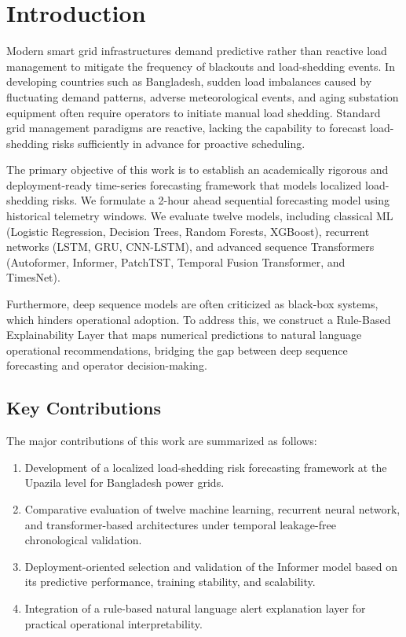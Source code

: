 \section{Introduction}
Modern smart grid infrastructures demand predictive rather than reactive load management to mitigate the frequency of blackouts and load-shedding events. In developing countries such as Bangladesh, sudden load imbalances caused by fluctuating demand patterns, adverse meteorological events, and aging substation equipment often require operators to initiate manual load shedding. Standard grid management paradigms are reactive, lacking the capability to forecast load-shedding risks sufficiently in advance for proactive scheduling.

The primary objective of this work is to establish an academically rigorous and deployment-ready time-series forecasting framework that models localized load-shedding risks. We formulate a 2-hour ahead sequential forecasting model using historical telemetry windows. We evaluate twelve models, including classical ML (Logistic Regression, Decision Trees, Random Forests, XGBoost), recurrent networks (LSTM, GRU, CNN-LSTM), and advanced sequence Transformers (Autoformer, Informer, PatchTST, Temporal Fusion Transformer, and TimesNet).

Furthermore, deep sequence models are often criticized as black-box systems, which hinders operational adoption. To address this, we construct a Rule-Based Explainability Layer that maps numerical predictions to natural language operational recommendations, bridging the gap between deep sequence forecasting and operator decision-making.

\subsection{Key Contributions}
The major contributions of this work are summarized as follows:
\begin{enumerate}
    \item Development of a localized load-shedding risk forecasting framework at the Upazila level for Bangladesh power grids.
    \item Comparative evaluation of twelve machine learning, recurrent neural network, and transformer-based architectures under temporal leakage-free chronological validation.
    \item Deployment-oriented selection and validation of the Informer model based on its predictive performance, training stability, and scalability.
    \item Integration of a rule-based natural language alert explanation layer for practical operational interpretability.
\end{enumerate}
